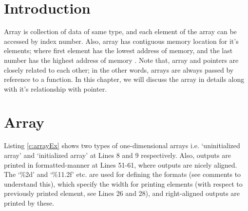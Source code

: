 \section{Introduction}
Array is collection of data of same type, and each element of the array can be accessed by index number. Also, array has contiguous memory location  for it's elements; where first element has the lowest address of memory, and the last number has the highest address of memory . Note that, array and pointers are closely related to each other; in the other words, arrays are always passed by reference to a function. In this chapter, we will discuss the array in details along with it's relationship with pointer. 

\section{Array}
Listing \ref{c:arrayEx} shows two types of one-dimensional arrays i.e. `uninitialized array' and `initialized array' at Lines 8 and 9 respectively. Also, outputs are printed in formatted-manner at Lines 51-61, where outputs are nicely aligned. The `\%2d' and `\%11.2f' etc. are used for defining the formats (see comments to understand this), which specify the width for printing elements (with respect to previously printed element, see Lines 26 and 28), and right-aligned outputs are printed by these. 

